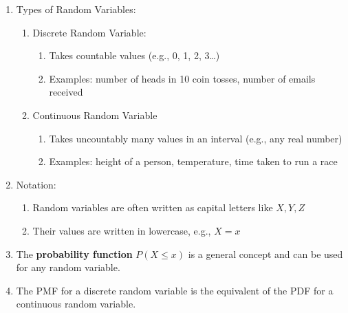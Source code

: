 \begin{enumerate}
    \item Types of Random Variables:
    \hfill \cite{common/online/chatgpt}
    \begin{enumerate}
        \item Discrete Random Variable:
        \hfill \cite{common/online/chatgpt}
        \begin{enumerate}
            \item Takes countable values (e.g., 0, 1, 2, 3…)
            \hfill \cite{common/online/chatgpt}
            
            \item Examples: number of heads in 10 coin tosses, number of emails received
            \hfill \cite{common/online/chatgpt}
        \end{enumerate}

        \item Continuous Random Variable
        \hfill \cite{common/online/chatgpt}
        \begin{enumerate}
            \item Takes uncountably many values in an interval (e.g., any real number)
            \hfill \cite{common/online/chatgpt}
            
            \item Examples: height of a person, temperature, time taken to run a race
            \hfill \cite{common/online/chatgpt}
        \end{enumerate}
    \end{enumerate}

    \item Notation:
    \begin{enumerate}
        \item Random variables are often written as capital letters like $X, Y, Z$
        \hfill \cite{common/online/chatgpt}

        \item Their values are written in lowercase, e.g., $X=x$
        \hfill \cite{common/online/chatgpt}
    \end{enumerate}

    \item The \textbf{probability function} $P(X \leq x)$ is a general concept and can be used for any random variable. 
    \hfill \cite{statistics/book/Statistics-for-Data-Scientists/Maurits-Kaptein}

    \item The PMF for a discrete random variable is the equivalent of the PDF for a continuous random variable. 
    \hfill \cite{statistics/book/Statistics-for-Data-Scientists/Maurits-Kaptein}
\end{enumerate}



